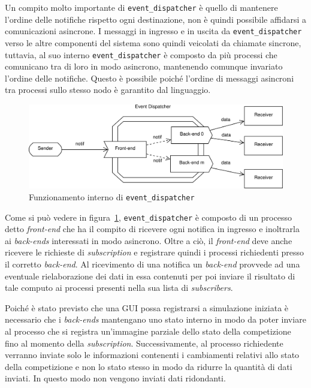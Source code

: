 \documentclass[a4paper]{report}
\begin{document}
Un compito molto importante di \texttt{event\_dispatcher} è quello di mantenere l'ordine delle notifiche rispetto ogni destinazione, non è quindi possibile affidarsi a comunicazioni asincrone.
I messaggi in ingresso e in uscita da \texttt{event\_dispatcher} verso le altre componenti del sistema sono quindi veicolati da chiamate sincrone, tuttavia, al suo interno \texttt{event\_dispatcher} è composto da più processi che comunicano tra di loro in modo asincrono, mantenendo comunque invariato l'ordine delle notifiche.
Questo è possibile poiché l'ordine di messaggi asincroni tra processi sullo stesso nodo è garantito dal linguaggio.

\begin{figure}
\includegraphics[width=\textwidth]{diagrammi/Dispatcher}
\caption{Funzionamento interno di \texttt{event\_dispatcher}}
\label{fig:dispatcher}
\end{figure}

Come si può vedere in figura~\ref{fig:dispatcher}, \texttt{event\_dispatcher} è composto di un processo detto \textit{front-end} che ha il compito di ricevere ogni notifica in ingresso e inoltrarla ai \textit{back-ends} interessati in modo asincrono. Oltre a ciò, il \textit{front-end} deve anche ricevere le richieste di \textit{subscription} e registrare quindi i processi richiedenti presso il corretto \textit{back-end}. Al ricevimento di una notifica un \textit{back-end} provvede ad una eventuale rielaborazione dei dati in essa contenuti per poi inviare il risultato di tale computo ai processi presenti nella sua lista di \textit{subscribers}.

Poiché è stato previsto che una GUI possa registrarsi a simulazione iniziata è necessario che i \textit{back-ends} mantengano uno stato interno in modo da poter inviare al processo che si registra un'immagine parziale dello stato della competizione fino al momento della \textit{subscription}. Successivamente, al processo richiedente verranno inviate solo le informazioni contenenti i cambiamenti relativi allo stato della competizione e non lo stato stesso in modo da ridurre la quantità di dati inviati. In questo modo non vengono inviati dati ridondanti.
\end{document}
